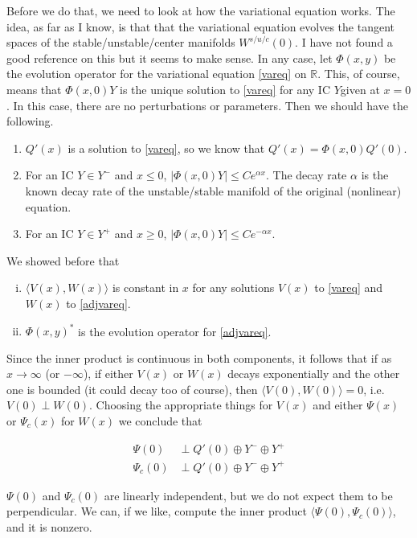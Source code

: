 \documentclass[12pt]{article}
\def\R{{\mathbb R}}
\begin{document}
Before we do that, we need to look at how the variational equation works. The idea, as far as I know, is that that the variational equation evolves the tangent spaces of the stable/unstable/center manifolds $W^{s/u/c}(0)$. I have not found a good reference on this but it seems to make sense. In any case, let $\Phi(x, y)$ be the evolution operator for the variational equation \eqref{vareq} on $\R$. This, of course, means that $\Phi(x, 0)Y$ is the unique solution to \eqref{vareq} for any IC $Y$given at $x = 0$. In this case, there are no perturbations or parameters. Then we should have the following.

\begin{enumerate}
	\item $Q'(x)$ is a solution to \eqref{vareq}, so we know that $Q'(x) = \Phi(x, 0)Q'(0)$.
	\item For an IC $Y \in Y^-$ and $x \leq 0$, $|\Phi(x, 0) Y| \leq C e^{\alpha x}$. The decay rate $\alpha$ is the known decay rate of the unstable/stable manifold of the original (nonlinear) equation.
	\item For an IC $Y \in Y^+$ and $x \geq 0$, $|\Phi(x, 0) Y| \leq C e^{-\alpha x}$. 
\end{enumerate}

We showed before that

\begin{enumerate}[(i)]
\item $\langle V(x), W(x) \rangle$ is constant in $x$ for any solutions $V(x)$ to \eqref{vareq} and $W(x)$ to \eqref{adjvareq}.
\item $\Phi(x, y)^*$ is the evolution operator for \eqref{adjvareq}.
\end{enumerate}

Since the inner product is continuous in both components, it follows that if as $x \rightarrow \infty$ (or $-\infty$), if either $V(x)$ or $W(x)$ decays exponentially and the other one is bounded (it could decay too of course), then $\langle V(0), W(0) \rangle = 0$, i.e. $V(0) \perp W(0)$. Choosing the appropriate things for $V(x)$ and either $\Psi(x)$ or $\Psi_c(x)$ for $W(x)$ we conclude that

\begin{align*}
\Psi(0) &\perp Q'(0) \oplus Y^- \oplus Y^+ \\
\Psi_c(0) &\perp Q'(0) \oplus Y^- \oplus Y^+
\end{align*}

$\Psi(0)$ and $\Psi_c(0)$ are linearly independent, but we do not expect them to be perpendicular. We can, if we like, compute the inner product $\langle \Psi(0), \Psi_c(0) \rangle$, and it is nonzero.\\
\end{document}
